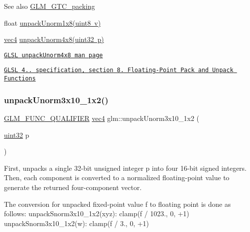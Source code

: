 \begin{DoxySeeAlso}{See also}
\mbox{\hyperlink{group__gtc__packing}{G\+L\+M\+\_\+\+G\+T\+C\+\_\+packing}} 

float \mbox{\hyperlink{group__gtc__packing_ga32f3f2642df2ea87449d59fb614a8305}{unpack\+Unorm1x8(uint8 v)}} 

\mbox{\hyperlink{group__core__types_ga5881b1b022d7fd1b7218f5916532dd02}{vec4}} \mbox{\hyperlink{group__core__func__packing_ga7f903259150b67e9466f5f8edffcd197}{unpack\+Unorm4x8(uint32 p)}} 

\href{http://www.opengl.org/sdk/docs/manglsl/xhtml/unpackUnorm4x8.xml}{\tt G\+L\+SL unpack\+Unorm4x8 man page} 

\href{http://www.opengl.org/registry/doc/GLSLangSpec.4.20.8.pdf}{\tt G\+L\+SL 4.. specification, section 8. Floating-\/\+Point Pack and Unpack Functions} 
\end{DoxySeeAlso}
\mbox{\label{group__gtc__packing_gaf69ace2b5e9234f8afb4e99c3df1193d}} 
\subsubsection{\texorpdfstring{unpack\+Unorm3x10\+\_\+1x2()}{unpackUnorm3x10\_1x2()}}
{\footnotesize\ttfamily \mbox{\hyperlink{setup_8hpp_a33fdea6f91c5f834105f7415e2a64407}{G\+L\+M\+\_\+\+F\+U\+N\+C\+\_\+\+Q\+U\+A\+L\+I\+F\+I\+ER}} \mbox{\hyperlink{group__core__types_ga5881b1b022d7fd1b7218f5916532dd02}{vec4}} glm\+::unpack\+Unorm3x10\+\_\+1x2 (\begin{DoxyParamCaption}\item[{\mbox{\hyperlink{group__gtc__type__precision_ga202b6a53c105fcb7e531f9b443518451}{uint32}}}]{p }\end{DoxyParamCaption})}

First, unpacks a single 32-\/bit unsigned integer p into four 16-\/bit signed integers. Then, each component is converted to a normalized floating-\/point value to generate the returned four-\/component vector.

The conversion for unpacked fixed-\/point value f to floating point is done as follows\+: unpack\+Snorm3x10\+\_\+1x2(xyz)\+: clamp(f / 1023., 0, +1) unpack\+Snorm3x10\+\_\+1x2(w)\+: clamp(f / 3., 0, +1)


